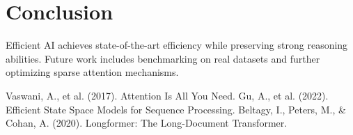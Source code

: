 \documentclass{article}
\begin{document}
\section{Conclusion}
Efficient AI achieves state-of-the-art efficiency while preserving strong reasoning abilities. Future work includes benchmarking on real datasets and further optimizing sparse attention mechanisms.

\begin{thebibliography}{9}
 Vaswani, A., et al. (2017). Attention Is All You Need.
 Gu, A., et al. (2022). Efficient State Space Models for Sequence Processing.
 Beltagy, I., Peters, M., & Cohan, A. (2020). Longformer: The Long-Document Transformer.
\end{thebibliography}
\end{document}
